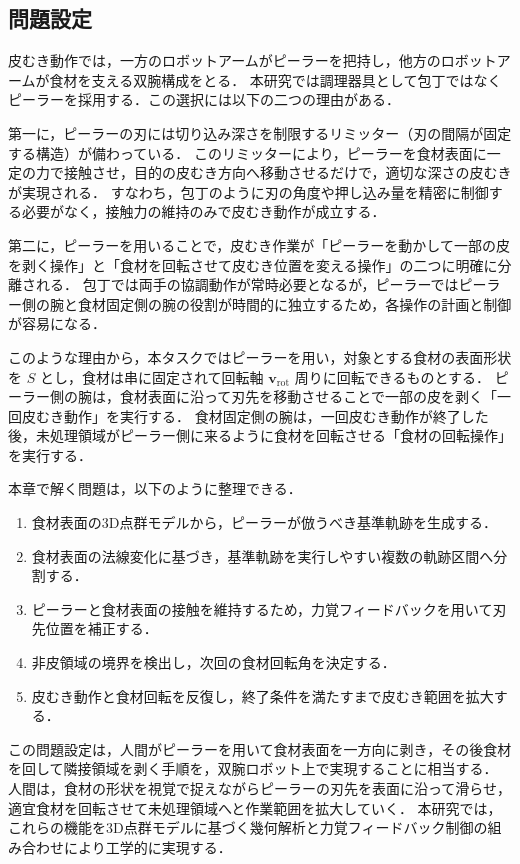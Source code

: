 \subsection{問題設定}
{
皮むき動作では，一方のロボットアームがピーラーを把持し，他方のロボットアームが食材を支える双腕構成をとる．
本研究では調理器具として包丁ではなくピーラーを採用する．この選択には以下の二つの理由がある．

第一に，ピーラーの刃には切り込み深さを制限するリミッター（刃の間隔が固定する構造）が備わっている．
このリミッターにより，ピーラーを食材表面に一定の力で接触させ，目的の皮むき方向へ移動させるだけで，適切な深さの皮むきが実現される．
すなわち，包丁のように刃の角度や押し込み量を精密に制御する必要がなく，接触力の維持のみで皮むき動作が成立する．

第二に，ピーラーを用いることで，皮むき作業が「ピーラーを動かして一部の皮を剥く操作」と「食材を回転させて皮むき位置を変える操作」の二つに明確に分離される．
包丁では両手の協調動作が常時必要となるが，ピーラーではピーラー側の腕と食材固定側の腕の役割が時間的に独立するため，各操作の計画と制御が容易になる．

このような理由から，本タスクではピーラーを用い，対象とする食材の表面形状を $S$ とし，食材は串に固定されて回転軸 $\mathbf{v}_{\mathrm{rot}}$ 周りに回転できるものとする．
ピーラー側の腕は，食材表面に沿って刃先を移動させることで一部の皮を剥く「一回皮むき動作」を実行する．
食材固定側の腕は，一回皮むき動作が終了した後，未処理領域がピーラー側に来るように食材を回転させる「食材の回転操作」を実行する．
}

本章で解く問題は，以下のように整理できる．

\begin{enumerate}
  \item 食材表面の3D点群モデルから，ピーラーが倣うべき基準軌跡を生成する．
  \item 食材表面の法線変化に基づき，基準軌跡を実行しやすい複数の軌跡区間へ分割する．
  \item ピーラーと食材表面の接触を維持するため，力覚フィードバックを用いて刃先位置を補正する．
  \item 非皮領域の境界を検出し，次回の食材回転角を決定する．
  \item 皮むき動作と食材回転を反復し，終了条件を満たすまで皮むき範囲を拡大する．
\end{enumerate}

この問題設定は，人間がピーラーを用いて食材表面を一方向に剥き，その後食材を回して隣接領域を剥く手順を，双腕ロボット上で実現することに相当する．
人間は，食材の形状を視覚で捉えながらピーラーの刃先を表面に沿って滑らせ，適宜食材を回転させて未処理領域へと作業範囲を拡大していく．
本研究では，これらの機能を3D点群モデルに基づく幾何解析と力覚フィードバック制御の組み合わせにより工学的に実現する．

